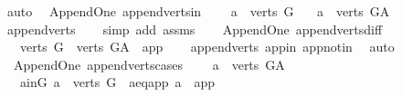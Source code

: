\begin{isabellebody}
\ auto%
\endisatagproof
{\isafoldproof}%
%
\isadelimproof
\isanewline
%
\endisadelimproof
\isanewline
{}\isamarkupfalse%
\ {\isacharparenleft}{\kern0pt}\ Append{\isacharunderscore}{\kern0pt}One{\isacharparenright}{\kern0pt}\ append{\isacharunderscore}{\kern0pt}verts{\isacharunderscore}{\kern0pt}in{\isacharcolon}{\kern0pt}\ \isanewline
\ \ \ {\isachardoublequoteopen}a\ {\isasymin}\ verts\ G{\isachardoublequoteclose}\isanewline
\ \ \ {\isachardoublequoteopen}a\ {\isasymin}\ verts\ G{\isacharunderscore}{\kern0pt}A{\isachardoublequoteclose}\isanewline
%
\isadelimproof
\ \ %
\endisadelimproof
%
\isatagproof
{}\isamarkupfalse%
\ append{\isacharunderscore}{\kern0pt}verts\isanewline
\ \ \isamarkupfalse%
\ {\isacharparenleft}{\kern0pt}simp\ add{\isacharcolon}{\kern0pt}\ assms{\isacharparenright}{\kern0pt}%
\endisatagproof
{\isafoldproof}%
%
\isadelimproof
\ \isanewline
%
\endisadelimproof
\isanewline
{}\isamarkupfalse%
\ {\isacharparenleft}{\kern0pt}\ Append{\isacharunderscore}{\kern0pt}One{\isacharparenright}{\kern0pt}\ append{\isacharunderscore}{\kern0pt}verts{\isacharunderscore}{\kern0pt}diff{\isacharcolon}{\kern0pt}\ \isanewline
\ \ \ {\isachardoublequoteopen}verts\ G\ {\isacharequal}{\kern0pt}\ verts\ G{\isacharunderscore}{\kern0pt}A\ {\isacharminus}{\kern0pt}\ {\isacharbraceleft}{\kern0pt}app{\isacharbraceright}{\kern0pt}{\isachardoublequoteclose}\isanewline
%
\isadelimproof
\ \ %
\endisadelimproof
%
\isatagproof
{}\isamarkupfalse%
\ append{\isacharunderscore}{\kern0pt}verts\ app{\isacharunderscore}{\kern0pt}in\ app{\isacharunderscore}{\kern0pt}notin\ \isamarkupfalse%
\ auto%
\endisatagproof
{\isafoldproof}%
%
\isadelimproof
\isanewline
%
\endisadelimproof
\isanewline
{}\isamarkupfalse%
\ {\isacharparenleft}{\kern0pt}\ Append{\isacharunderscore}{\kern0pt}One{\isacharparenright}{\kern0pt}\ append{\isacharunderscore}{\kern0pt}verts{\isacharunderscore}{\kern0pt}cases{\isacharcolon}{\kern0pt}\ \isanewline
\ \ \ {\isachardoublequoteopen}a\ {\isasymin}\ verts\ G{\isacharunderscore}{\kern0pt}A{\isachardoublequoteclose}\isanewline
\ \ \ {\isacharparenleft}{\kern0pt}a{\isacharunderscore}{\kern0pt}in{\isacharunderscore}{\kern0pt}G{\isacharparenright}{\kern0pt}\ {\isachardoublequoteopen}a\ {\isasymin}\ verts\ G{\isachardoublequoteclose}\ {\isacharbar}{\kern0pt}\ {\isacharparenleft}{\kern0pt}a{\isacharunderscore}{\kern0pt}eq{\isacharunderscore}{\kern0pt}app{\isacharparenright}{\kern0pt}\ {\isachardoublequoteopen}a\ {\isacharequal}{\kern0pt}\ app{\isachardoublequoteclose}\isanewline

\end{isabellebody}
